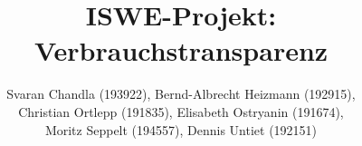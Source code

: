\documentclass{article}
\begin{document}
\title{ISWE-Projekt: Verbrauchstransparenz}
\author{Svaran Chandla (193922), Bernd-Albrecht Heizmann (192915),
    \\Christian Ortlepp (191835), Elisabeth Ostryanin (191674), \\Moritz Seppelt (194557), Dennis Untiet (192151)}
\maketitle   
\tableofcontents
\newpage






\end{document}
